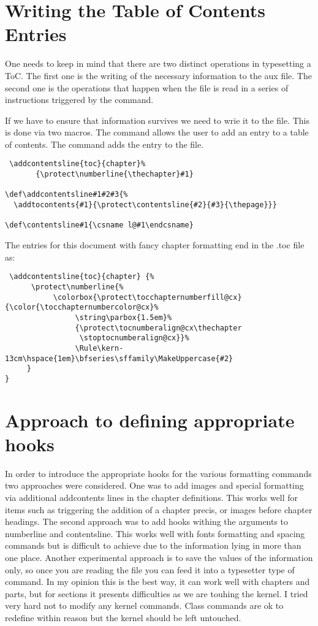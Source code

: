 \section{Writing the Table of Contents Entries}


One needs to keep in mind that there are two distinct operations in typesetting a ToC. The first one is the writing of the necessary information to the aux file. The second one is the operations that happen when the file is read in a series of instructions triggered by the  command.

If we have to ensure that information survives we need to wrie it to the file. This is done via two macros.
The  command allows the user to add an entry to a table of contents. The command adds the entry
 to the  file.

\begin{lstlisting}
 \addcontentsline{toc}{chapter}%
       {\protect\numberline{\thechapter}#1}

\def\addcontentsline#1#2#3{%
  \addtocontents{#1}{\protect\contentsline{#2}{#3}{\thepage}}}

\def\contentsline#1{\csname l@#1\endcsname}
\end{lstlisting}

The entries for this document with fancy chapter formatting end in the .toc file as:
\begin{lstlisting}
 \addcontentsline{toc}{chapter} {%
      \protect\numberline{%
           \colorbox{\protect\tocchapternumberfill@cx}{\color{\tocchapternumbercolor@cx}%
                \string\parbox{1.5em}%
                {\protect\tocnumberalign@cx\thechapter
                 \stoptocnumberalign@cx}}%
                \Rule\kern-13cm\hspace{1em}\bfseries\sffamily\MakeUppercase{#2}
     }
}
\end{lstlisting}


\section{Approach to defining appropriate hooks}

In order to introduce the appropriate hooks for the various formatting commands two approaches were considered. One was to add images and special formatting via additional addcontents lines in the chapter definitions. This works well for items such as triggering the addition of a chapter precis, or images before chapter headings. The second approach was to add hooks withing the arguments to numberline and contentsline. This works well with fonts formatting and spacing commands but is difficult to achieve due to the information lying in more than one place. Another experimental approach is to save the values of the information only, so once you are reading the file you can feed it into a typesetter type of command. In my opinion this is the best way, it can work well with chapters and parts, but for sections it presents difficulties as we are touhing the kernel. I tried very hard not to modify any kernel commands. Class commands are ok to redefine within reason but the kernel should be left untouched.

